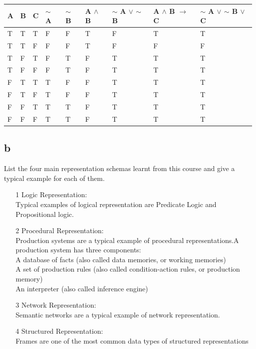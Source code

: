 \documentclass[12pt,a4paper]{article}
\begin{document}
	
				
			
				
	
			\begin{tabular} {|l|l|l||l|l|l||l|l||l|}
				\hline
				\hline
				A&B&C& $\mathord{\sim}$  A&$\mathord{\sim}$ B& A $\wedge$ B& $\mathord{\sim}$ A $\lor$ $\mathord{\sim}$ B& A $\wedge$ B $\rightarrow$ C& $\mathord{\sim}$ A $\lor$ $\mathord{\sim}$ B $\lor$ C \\
				\hline
				\hline
			T&T&T&F&F&T&F&T&T \\
			
			T&T&F&F&F&T&F&F&F \\
			T&F&T&F&T&F&T&T&T \\
			T&F&F&F&T&F&T&T&T \\
			F&T&T&T&F&F&T&T&T \\
			F&T&F&T&F&F&T&T&T \\
			F&F&T&T&T&F&T&T&T \\
			F&F&F&T&T&F&T&T&T\\
			\hline
				
			\end{tabular}
			
	
		
		
	\newpage
			
			
	\subsection{b}
		List the four main representation schemas learnt from this course and give a typical 	example for each of them.
		\begin{itemize}
			
		\item[1] Logic Representation:\\
		Typical examples of logical representation are Predicate Logic and Propositional logic.
		
		
		\item[2] Procedural Representation:\\
		Production systems are a typical example of procedural representations.A production system has three components:\\
		A database of facts (also called data memories, or working memories)\\	
		A set of production rules (also called condition-action rules, or production memory)\\	
		An interpreter (also called inference engine)
		
		\item[3] Network Representation:\\
		Semantic networks are a typical example of network representation.
		
		\item[4] Structured Representation:\\
		Frames are one of the most common data types of structured representations
		\end{itemize}
	
\end{document}
